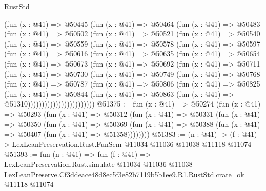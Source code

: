 \begin{lexlean}{RustStd}
\begin{coremodule}
    (fun (x : @41) =>
    @50445
      (fun (x : @41) =>
      @50464
        (fun (x : @41) =>
        @50483
          (fun (x : @41) =>
          @50502
            (fun (x : @41) =>
            @50521
              (fun (x : @41) =>
              @50540
                (fun (x : @41) =>
                @50559
                  (fun (x : @41) =>
                  @50578
                    (fun (x : @41) =>
                    @50597
                      (fun (x : @41) =>
                      @50616
                        (fun (x : @41) =>
                        @50635
                          (fun (x : @41) =>
                          @50654
                            (fun (x : @41) =>
                            @50673
                              (fun (x : @41) =>
                              @50692
                                (fun (x : @41) =>
                                @50711
                                  (fun (x : @41) =>
                                  @50730
                                    (fun (x : @41) =>
                                    @50749
                                      (fun (x : @41) =>
                                      @50768
                                        (fun (x : @41) =>
                                        @50787
                                          (fun (x : @41) =>
                                          @50806
                                            (fun (x : @41) =>
                                            @50825
                                              (fun (x : @41) =>
                                              @50844
                                                (fun (x : @41) =>
                                                @50863
                                                  (fun (x : @41) => @51310))))))))))))))))))))))))
@51375 := fun (x : @41) =>
  @50274
    (fun (x : @41) =>
    @50293
      (fun (x : @41) =>
      @50312
        (fun (x : @41) =>
        @50331
          (fun (x : @41) =>
          @50350
            (fun (x : @41) =>
            @50369
              (fun (x : @41) => @50388 (fun (x : @41) => @50407 (fun (x : @41) => @51358))))))))
@51383 := (n : @41) ->
  (f : @41) -> LexLeanPreservation.Rust.FunSem @11034 @11036 @11038 @11118 @11074
@51393 := fun (n : @41) =>
  fun (f : @41) =>
  LexLeanPreservation.Rust.simulate
    @11034
    @11036
    @11038
    LexLeanPreserve.Cf3ddeace48d8ec5f3e82b7119b5b1ee9.R1.RustStd.crate_ok
    @11118
    @11074
\end{coremodule}
\end{lexlean}
